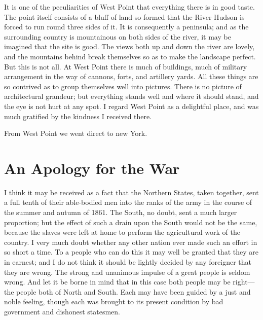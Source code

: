 It is one of the peculiarities of West Point that everything there
is in good taste.  The point itself consists of a bluff of land so
formed that the River Hudson is forced to run round three sides of
it.  It is consequently a peninsula; and as the surrounding country
is mountainous on both sides of the river, it may be imagined that
the site is good.  The views both up and down the river are lovely,
and the mountains behind break themselves so as to make the
landscape perfect.  But this is not all.  At West Point there is
much of buildings, much of military arrangement in the way of
cannons, forts, and artillery yards.  All these things are so
contrived as to group themselves well into pictures.  There is no
picture of architectural grandeur; but everything stands well and
where it should stand, and the eye is not hurt at any spot.  I
regard West Point as a delightful place, and was much gratified by
the kindness I received there.

From West Point we went direct to new York.



\chapter{An Apology for the War}


I think it may be received as a fact that the Northern States,
taken together, sent a full tenth of their able-bodied men into the
ranks of the army in the course of the summer and autumn of 1861.
The South, no doubt, sent a much larger proportion; but the effect
of such a drain upon the South would not be the same, because the
slaves were left at home to perform the agricultural work of the
country.  I very much doubt whether any other nation ever made such
an effort in so short a time.  To a people who can do this it may
well be granted that they are in earnest; and I do not think it
should be lightly decided by any foreigner that they are wrong.
The strong and unanimous impulse of a great people is seldom wrong.
And let it be borne in mind that in this case both people may be
right---the people both of North and South.  Each may have been
guided by a just and noble feeling, though each was brought to its
present condition by bad government and dishonest statesmen.

